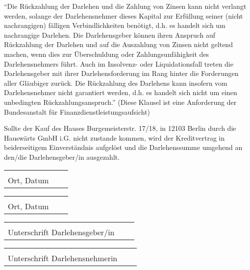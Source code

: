\documentclass[]{scrartcl}
\begin{document}
\begin{contract}
“Die Rückzahlung der Darlehen und die Zahlung von Zinsen kann nicht verlangt werden, solange der Darlehensnehmer dieses Kapital zur Erfüllung seiner (nicht nachrangigen) fälligen Verbindlichkeiten benötigt, d.h. es handelt sich um nachrangige Darlehen. Die Darlehensgeber können ihren Anspruch auf Rückzahlung der Darlehen und auf die Auszahlung von Zinsen nicht geltend machen, wenn dies zur Überschuldung oder Zahlungsunfähigkeit des Darlehensnehmers führt. Auch im Insolvenz- oder Liquidationsfall treten die Darlehensgeber mit ihrer Darlehensforderung im Rang hinter die Forderungen aller Gläubiger zurück. Die Rückzahlung des Darlehens kann insofern vom Darlehensnehmer nicht garantiert werden, d.h. es handelt sich nicht um einen unbedingten Rückzahlungsanspruch.” (Diese Klausel ist eine Anforderung der Bundesanstalt für Finanzdienstleistungsaufsicht)

Sollte der Kauf des Hauses Burgemeisterstr. 17/18, in 12103 Berlin durch die Hauswärts GmbH i.G. nicht zustande kommen, wird der Kreditvertrag in beiderseitigem Einverständnis aufgelöst und die Darlehenssumme umgehend an den/die Darlehensgeber/in ausgezahlt.

\end{contract}

\vspace{1,5 cm}
\begin{tabular}{p{7cm}p{.5cm}l}
\dotfill \\
Ort, Datum
\end{tabular}%
\hfill
\begin{tabular}{p{7cm}p{.5cm}l}
\dotfill \\
Ort, Datum
\end{tabular}%

\vspace{1,5 cm}
\begin{tabular}{p{7cm}p{.5cm}l}
\dotfill \\
Unterschrift Darlehensgeber/in
\end{tabular}%
\hfill
\begin{tabular}{p{7cm}p{.5cm}l}
\dotfill \\
Unterschrift Darlehensnehmerin
\end{tabular}%
\end{document}
